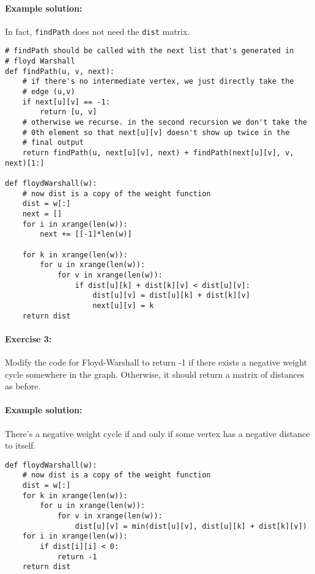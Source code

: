 \documentclass[11pt]{article}
\begin{document}
\paragraph{Example solution:}
In fact, \texttt{findPath} does not need the \texttt{dist} matrix.

\begin{verbatim}
# findPath should be called with the next list that's generated in
# floyd Warshall
def findPath(u, v, next):
    # if there's no intermediate vertex, we just directly take the
    # edge (u,v)
    if next[u][v] == -1:
        return [u, v]
    # otherwise we recurse. in the second recursion we don't take the
    # 0th element so that next[u][v] doesn't show up twice in the
    # final output
    return findPath(u, next[u][v], next) + findPath(next[u][v], v, next)[1:]

def floydWarshall(w):
    # now dist is a copy of the weight function
    dist = w[:]
    next = []
    for i in xrange(len(w)):
        next += [[-1]*len(w)]

    for k in xrange(len(w)):
        for u in xrange(len(w)):
            for v in xrange(len(w)):
                if dist[u][k] + dist[k][v] < dist[u][v]:
                    dist[u][v] = dist[u][k] + dist[k][v]
                    next[u][v] = k
    return dist
\end{verbatim}

\paragraph{Exercise 3:}
Modify the code for Floyd-Warshall to return -1 if there exists a
negative weight cycle somewhere in the graph.  Otherwise, it should
return a matrix of distances as before.

\paragraph{Example solution:}
There's a negative weight cycle if and only if some vertex has a
negative distance to itself.

\begin{verbatim}
def floydWarshall(w):
    # now dist is a copy of the weight function
    dist = w[:]
    for k in xrange(len(w)):
        for u in xrange(len(w)):
            for v in xrange(len(w)):
                dist[u][v] = min(dist[u][v], dist[u][k] + dist[k][v])
    for i in xrange(len(w)):
        if dist[i][i] < 0:
            return -1
    return dist
\end{verbatim}
\end{document}
